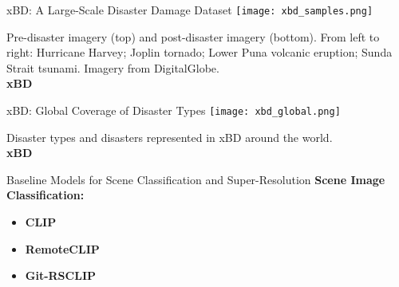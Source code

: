 \begin{refsection}
  \begin{frame}{xBD: A Large-Scale Disaster Damage Dataset}
    \centering
    \texttt{[image: xbd\_samples.png]}
    
    \vspace{0.5em}
    \scriptsize
    Pre-disaster imagery (top) and post-disaster imagery (bottom). From left to right: Hurricane Harvey; Joplin tornado; Lower Puna volcanic eruption; Sunda Strait tsunami. Imagery from DigitalGlobe.\\
    \textbf{xBD}~\parencite{guptaCreatingXBDDataset2019}
    \bottomleftrefs
  \end{frame}
\end{refsection}

\begin{refsection}
  \begin{frame}{xBD: Global Coverage of Disaster Types}
    \centering
    \texttt{[image: xbd\_global.png]}
    
    \vspace{0.5em}
    \scriptsize
    Disaster types and disasters represented in xBD around the world.\\
    \textbf{xBD}~\parencite{guptaCreatingXBDDataset2019}
    \bottomleftrefs
  \end{frame}
\end{refsection}

\begin{refsection}
  \begin{frame}{Baseline Models for Scene Classification and Super-Resolution}
    \textbf{Scene Image Classification:}
    \begin{itemize}
      \item \textbf{CLIP}~\parencite{radfordLearningTransferableVisual2021}
      \item \textbf{RemoteCLIP}~\parencite{liuRemoteCLIPVisionLanguage2024}
      \item \textbf{Git-RSCLIP}~\parencite{text2earth2025}
    \end{itemize}
    \bottomleftrefs
  \end{frame}
  \end{refsection}

